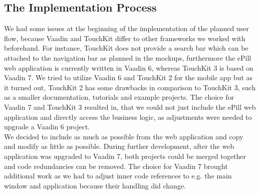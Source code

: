 \subsection{The Implementation Process}
\label{subsec:Implementation}
We had some issues at the beginning of the implementation of the planned user flow, because Vaadin and TouchKit differ to other frameworks we worked with beforehand. For instance, TouchKit does not provide a search bar which can be attached to the navigation bar as planned in the mockups, furthermore the ePill web application is currently written in Vaadin 6, whereas TouchKit 3 is based on Vaadin 7. We tried to utilize Vaadin 6 and TouchKit 2 for the mobile app but as it turned out, TouchKit 2 has some drawbacks in comparison to TouchKit 3, such as a smaller documentation, tutorials and example projects. The choice for Vaadin 7 and TouchKit 3 resulted in, that we could not just include the ePill web application and directly access the business logic, as adjustments were needed to upgrade a Vaadin 6 project. 
\\
We decided to include as much as possible from the web application and copy and modify as little as possible. During further development, after the web application was upgraded to Vaadin 7, both projects could be merged together and code redundancies can be removed. The choice for Vaadin 7 brought additional work as we had to adjust inner code references to e.g. the main window and application because their handling did change.
